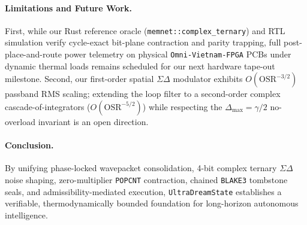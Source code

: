 \documentclass[10pt, twocolumn, a4paper]{article}
\begin{document}
\paragraph{Limitations and Future Work.}
First, while our Rust reference oracle (\texttt{memnet::complex\_ternary}) and RTL simulation verify cycle-exact bit-plane contraction and parity trapping, full post-place-and-route power telemetry on physical \texttt{Omni-Vietnam-FPGA} PCBs under dynamic thermal loads remains scheduled for our next hardware tape-out milestone. Second, our first-order spatial $\Sigma\Delta$ modulator exhibits $O(\text{OSR}^{-3/2})$ passband RMS scaling; extending the loop filter to a second-order complex cascade-of-integrators ($O(\text{OSR}^{-5/2})$) while respecting the $\Delta_{\max} = \gamma/2$ no-overload invariant is an open direction.

\paragraph{Conclusion.}
By unifying phase-locked wavepacket consolidation, 4-bit complex ternary $\Sigma\Delta$ noise shaping, zero-multiplier \texttt{POPCNT} contraction, chained \texttt{BLAKE3} tombstone seals, and admissibility-mediated execution, \texttt{UltraDreamState} establishes a verifiable, thermodynamically bounded foundation for long-horizon autonomous intelligence.
\end{document}
